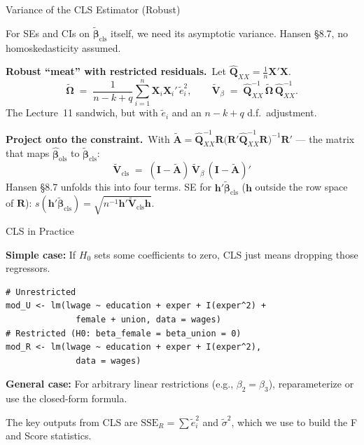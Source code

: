 \documentclass[handout, aspectratio=169]{beamer}
\numberwithin{equation}{section}
\begin{document}
\begin{frame}{Variance of the CLS Estimator (Robust)}

For SEs and CIs on $\tilde{\bm{\beta}}_{\text{cls}}$ itself, we need its asymptotic variance.  Hansen \S 8.7, no homoskedasticity assumed.

\pause
\smallskip

\textbf{Robust ``meat'' with restricted residuals.}\, Let $\hat{\bm{Q}}_{XX} = \tfrac{1}{n}\bm{X}'\bm{X}$.
$$\tilde{\bm{\Omega}} \;=\; \frac{1}{n-k+q}\sum_{i=1}^n \bm{X}_i\bm{X}_i'\,\tilde{e}_i^2, \qquad \tilde{\bm{V}}_\beta \;=\; \hat{\bm{Q}}_{XX}^{-1}\,\tilde{\bm{\Omega}}\,\hat{\bm{Q}}_{XX}^{-1}.$$
The Lecture~11 sandwich, but with $\tilde{e}_i$ and an $n-k+q$ d.f.\ adjustment.

\pause
\smallskip

\textbf{Project onto the constraint.}\, With $\tilde{\bm{A}} = \hat{\bm{Q}}_{XX}^{-1}\bm{R}\bigl(\bm{R}'\hat{\bm{Q}}_{XX}^{-1}\bm{R}\bigr)^{-1}\bm{R}'$ --- the matrix that maps $\hat{\bm{\beta}}_{\text{ols}}$ to $\tilde{\bm{\beta}}_{\text{cls}}$:
$$\boxed{\;\tilde{\bm{V}}_{\text{cls}} \;=\; (\bm{I} - \tilde{\bm{A}})\,\tilde{\bm{V}}_\beta\,(\bm{I} - \tilde{\bm{A}})'\;}$$
Hansen \S 8.7 unfolds this into four terms.  SE for $\bm{h}'\tilde{\bm{\beta}}_{\text{cls}}$ ($\bm{h}$ outside the row space of $\bm{R}$): $s(\bm{h}'\tilde{\bm{\beta}}_{\text{cls}}) = \sqrt{n^{-1}\bm{h}'\tilde{\bm{V}}_{\text{cls}}\bm{h}}$.
\end{frame}

\begin{frame}[fragile]{CLS in Practice}

\textbf{Simple case:} If $H_0$ sets some coefficients to zero, CLS just means dropping those regressors.

\begin{lstlisting}
# Unrestricted
mod_U <- lm(lwage ~ education + exper + I(exper^2) +
              female + union, data = wages)
# Restricted (H0: beta_female = beta_union = 0)
mod_R <- lm(lwage ~ education + exper + I(exper^2),
              data = wages)
\end{lstlisting}

\pause
\smallskip

\textbf{General case:} For arbitrary linear restrictions (e.g., $\beta_2 = \beta_3$), reparameterize or use the closed-form formula.

\pause
\smallskip

\begin{tcolorbox}[colback=blue!5, colframe=blue!50]
The key outputs from CLS are $\text{SSE}_R = \sum \tilde{e}_i^2$ and $\tilde{\sigma}^2$, which we use to build the F and Score statistics.
\end{tcolorbox}
\end{frame}
\end{document}
